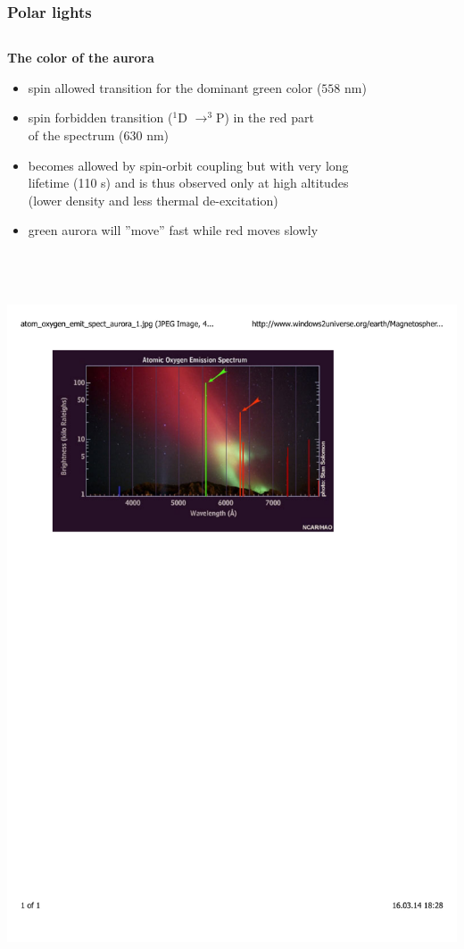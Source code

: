 \documentclass[mathserif,8pt]{beamer}
\begin{document}
\begin{frame}
    \frametitle{Polar lights}
    \begin{columns}
    \begin{column}{.60\textwidth}
	\textbf{The color of the aurora}
	\begin{itemize}
	    \item   spin allowed transition for the dominant green color ($558$ nm)
	    \item   spin forbidden transition ($^1$D $\rightarrow ^3$P) in the red part\\ 
		    of the spectrum ($630$ nm)
	    \item   becomes allowed by spin-orbit coupling but with very long\\
		    lifetime (110 s) and is thus observed only at high altitudes\\
		    (lower density and less thermal de-excitation)
	    \item   green aurora will ''move'' fast while red moves slowly
	\end{itemize}
	\ \\
	\ \\
	\ \\
	\centering
	\includegraphics[viewport = 80 540 430 800, clip, scale=0.4]{figures/aurora_spectrum.pdf}

\end{column}
\end{columns}
\end{frame}
\end{document}
